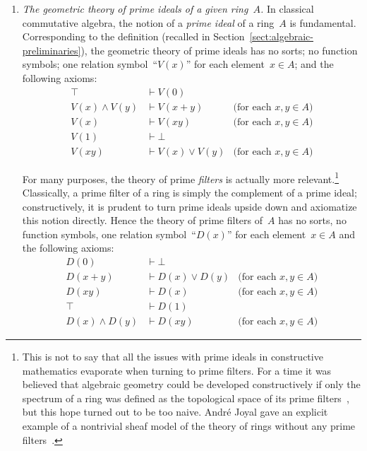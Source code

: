 \documentclass{ws-rv9x6}
\begin{document}
{\begin{enumerate}
A model of this geometric theory consists of two families of truth values, both
indexed by the rational numbers, hence two subsets~$L,U \subseteq \QQ$, in such
a way that~$\langle L,U \rangle$ is a Dedekind cut.

\item \emph{The geometric theory of prime ideals of a given ring~$A$.} In classical
commutative algebra, the notion of a \emph{prime ideal} of a ring~$A$ is
fundamental. Corresponding to the definition (recalled in
Section~\ref{sect:algebraic-preliminaries}), the geometric theory of prime
ideals has no sorts; no function
symbols; one relation symbol~``$V(x)$'' for each element~$x \in A$; and the
following axioms:
\begin{align*}
  \top &\vdash V(0) \\
  V(x) \wedge V(y) &\vdash V(x+y) & \text{(for each~$x,y \in A$)} \\
  V(x) &\vdash V(xy) & \text{(for each~$x,y \in A$)} \\
  V(1) &\vdash \bot \\
  V(xy) &\vdash V(x) \vee V(y) & \text{(for each~$x,y \in A$)}
\end{align*}

For many purposes, the theory of prime \emph{filters} is actually more
relevant.\footnote{This is not to say that all the issues with prime ideals in
constructive mathematics evaporate when turning to prime filters. For a time it
was believed that algebraic geometry could be developed constructively if only
the spectrum of a ring was defined as the topological space of its prime
filters~\cite[Section~3]{lawvere:icm-address}, but this hope turned out to be
too naive. André Joyal gave an explicit example of a nontrivial sheaf model of
the theory of rings without any prime filters~\cite[pp.~200f.]{tierney:spectrum}.}
Classically, a prime filter of a ring is simply the complement of a
prime ideal; constructively, it is prudent to turn prime ideals upside down and axiomatize this notion directly.
Hence the theory of prime filters of~$A$ has no sorts, no function symbols, one
relation symbol~``$D(x)$'' for each element~$x \in A$ and the following
axioms:
\begin{align*}
  D(0) &\vdash \bot \\
  D(x+y) &\vdash D(x) \vee D(y) & \text{(for each~$x,y \in A$)} \\
  D(xy) &\vdash D(x) & \text{(for each~$x,y \in A$)} \\
  \top &\vdash D(1) \\
  D(x) \wedge D(y) &\vdash D(xy) & \text{(for each~$x,y \in A$)}
\end{align*}


\end{enumerate}}
\end{document}
